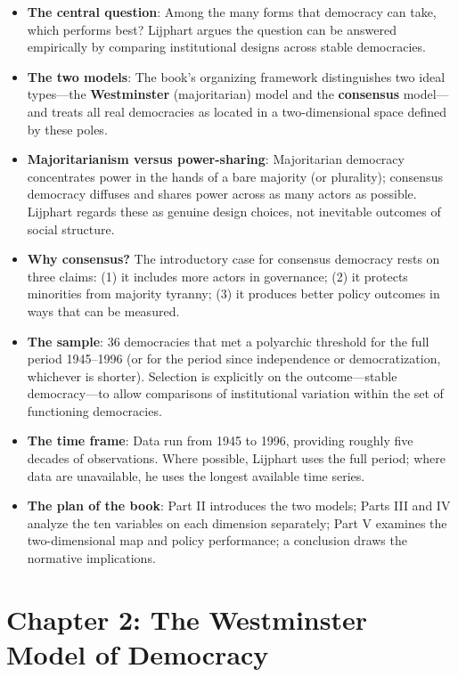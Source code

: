 \documentclass[12pt]{article}
\begin{document}
\begin{itemize}[leftmargin=*, itemsep=4pt]
    \item \textbf{The central question}: Among the many forms that democracy can take, which performs best? Lijphart argues the question can be answered empirically by comparing institutional designs across stable democracies.
    \item \textbf{The two models}: The book's organizing framework distinguishes two ideal types---the \textbf{Westminster} (majoritarian) model and the \textbf{consensus} model---and treats all real democracies as located in a two-dimensional space defined by these poles.
    \item \textbf{Majoritarianism versus power-sharing}: Majoritarian democracy concentrates power in the hands of a bare majority (or plurality); consensus democracy diffuses and shares power across as many actors as possible. Lijphart regards these as genuine design choices, not inevitable outcomes of social structure.
    \item \textbf{Why consensus?} The introductory case for consensus democracy rests on three claims: (1) it includes more actors in governance; (2) it protects minorities from majority tyranny; (3) it produces better policy outcomes in ways that can be measured.
    \item \textbf{The sample}: 36 democracies that met a polyarchic threshold for the full period 1945--1996 (or for the period since independence or democratization, whichever is shorter). Selection is explicitly on the outcome---stable democracy---to allow comparisons of institutional variation within the set of functioning democracies.
    \item \textbf{The time frame}: Data run from 1945 to 1996, providing roughly five decades of observations. Where possible, Lijphart uses the full period; where data are unavailable, he uses the longest available time series.
    \item \textbf{The plan of the book}: Part II introduces the two models; Parts III and IV analyze the ten variables on each dimension separately; Part V examines the two-dimensional map and policy performance; a conclusion draws the normative implications.
\end{itemize}

\section{Chapter 2: The Westminster Model of Democracy}
\end{document}
